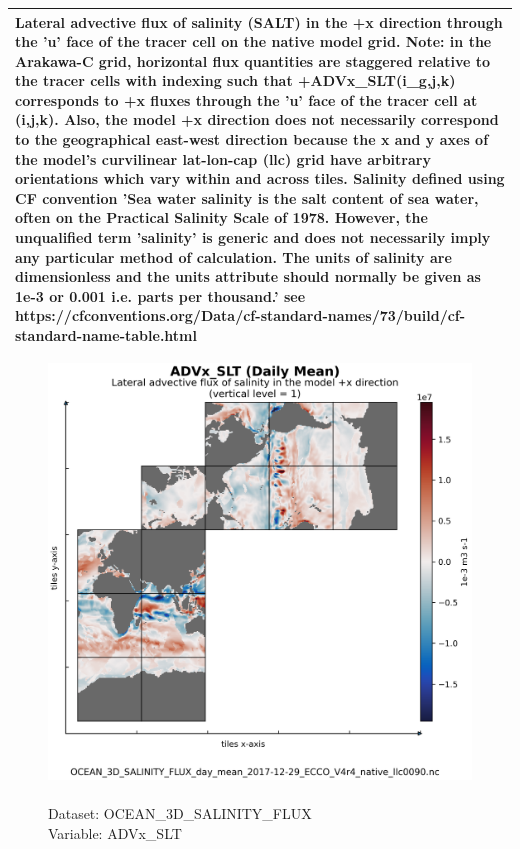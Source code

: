 \begin{longtable}{|p{}|p{}|p{}|p{}|}
\multicolumn{4}{|p{1\textwidth}|}{Lateral advective flux of salinity (SALT) in the +x direction through the 'u' face of the tracer cell on the native model grid. Note: in the Arakawa-C grid, horizontal flux quantities are staggered relative to the tracer cells with indexing such that +ADVx\_SLT(i\_g,j,k) corresponds to +x fluxes through the 'u' face of the tracer cell at (i,j,k). Also, the model +x direction does not necessarily correspond to the geographical east-west direction because the x and y axes of the model's curvilinear lat-lon-cap (llc) grid have arbitrary orientations which vary within and across tiles. Salinity defined using CF convention 'Sea water salinity is the salt content of sea water, often on the Practical Salinity Scale of 1978. However, the unqualified term 'salinity' is generic and does not necessarily imply any particular method of calculation. The units of salinity are dimensionless and the units attribute should normally be given as 1e-3 or 0.001 i.e. parts per thousand.' see https://cfconventions.org/Data/cf-standard-names/73/build/cf-standard-name-table.html} \\ \hline
\end{longtable}

\begin{figure}[H]
\centering
\includegraphics[scale=0.5]{../images/plots/native_plots/Ocean_Three-Dimensional_Salinity_Fluxes/ADVx_SLT.png}
\caption{\\Dataset: OCEAN\_3D\_SALINITY\_FLUX\\Variable: ADVx\_SLT}
\label{tab:table-OCEAN_3D_SALINITY_FLUX_ADVx_SLT-Plot}
\end{figure}
\pagebreak
